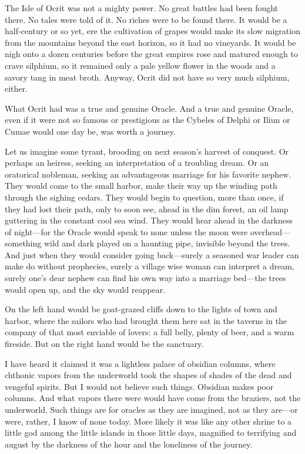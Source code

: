 

The Isle of Ocrit was not a mighty power. No great battles had been fought there. No tales were told of it. No riches were to be found there. It would be a half-century or so yet, ere the cultivation of grapes would make its slow migration from the mountains beyond the east horizon, so it had no vineyards. It would be nigh onto a dozen centuries before the great empires rose and matured enough to crave silphium, so it remained only a pale yellow flower in the woods and a savory tang in meat broth. Anyway, Ocrit did not have so very much silphium, either.

What Ocrit had was a true and genuine Oracle. And a true and genuine Oracle, even if it were not so famous or prestigious as the Cybeles of Delphi or Iliun or Cumae would one day be, was worth a journey.

Let us imagine some tyrant, brooding on next season's harvest of conquest. Or perhaps an heiress, seeking an interpretation of a troubling dream. Or an oratorical nobleman, seeking an advantageous marriage for his favorite nephew. They would come to the small harbor, make their way up the winding path through the sighing cedars. They would begin to question, more than once, if they had lost their path, only to soon see, ahead in the dim forest, an oil lamp guttering in the constant cool sea wind. They would hear ahead in the darkness of night---for the Oracle would speak to none unless the moon were overhead---something wild and dark played on a haunting pipe, invisible beyond the trees. And just when they would consider going back---surely a seasoned war leader can make do without prophecies, surely a village wise woman can interpret a dream, surely one's dear nephew can find his own way into a marriage bed---the trees would open up, and the sky would reappear.

On the left hand would be goat-grazed cliffs down to the lights of town and harbor, where the sailors who had brought them here sat in the taverns in the company of that most enviable of lovers: a full belly, plenty of beer, and a warm fireside. But on the right hand would be the sanctuary.

I have heard it claimed it was a lightless palace of obsidian columns, where chthonic vapors from the underworld took the shapes of shades of the dead and vengeful spirits. But I would not believe such things. Obsidian makes poor columns. And what vapors there were would have come from the braziers, not the underworld. Such things are for oracles as they are imagined, not as they are---or were, rather, I know of none today. More likely it was like any other shrine to a little god among the little islands in those little days, magnified to terrifying and august by the darkness of the hour and the loneliness of the journey.


